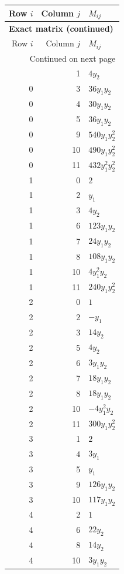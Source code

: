 \documentclass[10pt,a4paper]{article}
\begin{document}
{\small\setlength{\tabcolsep}{7pt}\begin{longtable}{rrp{125mm}}
\toprule Row $i$ & Column $j$ & $M_{ij}$\\\midrule\endfirsthead
\multicolumn{3}{l}{\textbf{Exact matrix (continued)}}\\
\toprule Row $i$ & Column $j$ & $M_{ij}$\\\midrule\endhead
\midrule\multicolumn{3}{r}{Continued on next page}\\\endfoot\bottomrule\endlastfoot
0 & 1 & $4 y_{2}$\\
0 & 3 & $36 y_{1} y_{2}$\\
0 & 4 & $30 y_{1} y_{2}$\\
0 & 5 & $36 y_{1} y_{2}$\\
0 & 9 & $540 y_{1} y_{2}^{2}$\\
0 & 10 & $490 y_{1} y_{2}^{2}$\\
0 & 11 & $432 y_{1}^{2} y_{2}^{2}$\\
1 & 0 & $2$\\
1 & 2 & $y_{1}$\\
1 & 3 & $4 y_{2}$\\
1 & 6 & $123 y_{1} y_{2}$\\
1 & 7 & $24 y_{1} y_{2}$\\
1 & 8 & $108 y_{1} y_{2}$\\
1 & 10 & $4 y_{1}^{2} y_{2}$\\
1 & 11 & $240 y_{1} y_{2}^{2}$\\
2 & 0 & $1$\\
2 & 2 & $- y_{1}$\\
2 & 3 & $14 y_{2}$\\
2 & 5 & $4 y_{2}$\\
2 & 6 & $3 y_{1} y_{2}$\\
2 & 7 & $18 y_{1} y_{2}$\\
2 & 8 & $18 y_{1} y_{2}$\\
2 & 10 & $- 4 y_{1}^{2} y_{2}$\\
2 & 11 & $300 y_{1} y_{2}^{2}$\\
3 & 1 & $2$\\
3 & 4 & $3 y_{1}$\\
3 & 5 & $y_{1}$\\
3 & 9 & $126 y_{1} y_{2}$\\
3 & 10 & $117 y_{1} y_{2}$\\
4 & 2 & $1$\\
4 & 6 & $22 y_{2}$\\
4 & 8 & $14 y_{2}$\\
4 & 10 & $3 y_{1} y_{2}$\\

\end{longtable}}
\end{document}
